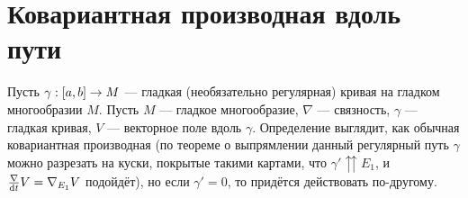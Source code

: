 \documentclass[a4paper]{report}
\begin{document}
    \section{Ковариантная производная вдоль пути}
    Пусть $\gamma: [a, b] \rightarrow M$ --- гладкая (необязательно регулярная) кривая на гладком многообразии $M$.
    Пусть $M$ --- гладкое многообразие, $\nabla$ --- связность, $\gamma$ --- гладкая кривая, $V$ --- векторное поле вдоль $\gamma$.
    Определение выглядит, как обычная ковариантная производная (по теореме о выпрямлении данный регулярный путь $\gamma$ можно разрезать на куски, покрытые такими картами, что $\gamma' \upuparrows E_1$, и $\frac{\nabla}{\operatorname{d}\! t}V = \nabla_{E_1}V$ подойдёт), но если $\gamma' = 0$, то придётся действовать по-другому.
\end{document}
